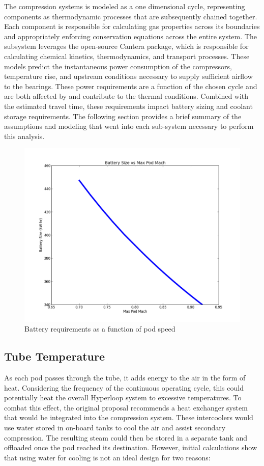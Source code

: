 \documentclass[heading.tex]{subfiles}
\begin{document}
The compression systems is modeled as a one dimensional cycle, representing components as thermodynamic processes that are
subsequently chained together. Each component is responsible for calculating gas properties across its boundaries and appropriately
enforcing conservation equations across the entire system. The subsystem leverages the open-source Cantera package, which is 
responsible for calculating chemical kinetics, thermodynamics, and transport processes. These models predict the instantaneous
power consumption of the compressors, temperature rise, and upstream conditions necessary to supply sufficient airflow to the bearings.
These power requirements are a function of the chosen cycle and are both affected by and contribute to the thermal conditions. 
Combined with the estimated travel time, these requirements impact battery sizing and coolant storage requirements.
The following section provides a brief summary of the assumptions and modeling that went into each sub-system necessary to perform this analysis.

\begin{figure}[H]
\centering
\includegraphics[width=\textwidth]{images/mach_vs_energy.png}
\caption{Battery requirements as a function of pod speed}
\end{figure}

\subsection{Tube Temperature}

As each pod passes through the tube, it adds energy to the air in the form of heat. Considering the frequency of the continuous operating cycle,
this could potentially heat the overall Hyperloop system to excessive temperatures.
To combat this effect, the original proposal recommends a heat exchanger system that would 
be integrated into the compression system. These intercoolers would use water stored in on-board tanks to cool the
air and assist secondary compression. The resulting steam could then be stored in a separate tank and offloaded once the pod reached its destination.
However, initial calculations show that using water for cooling is not an ideal design for two reasons:
\end{document}

